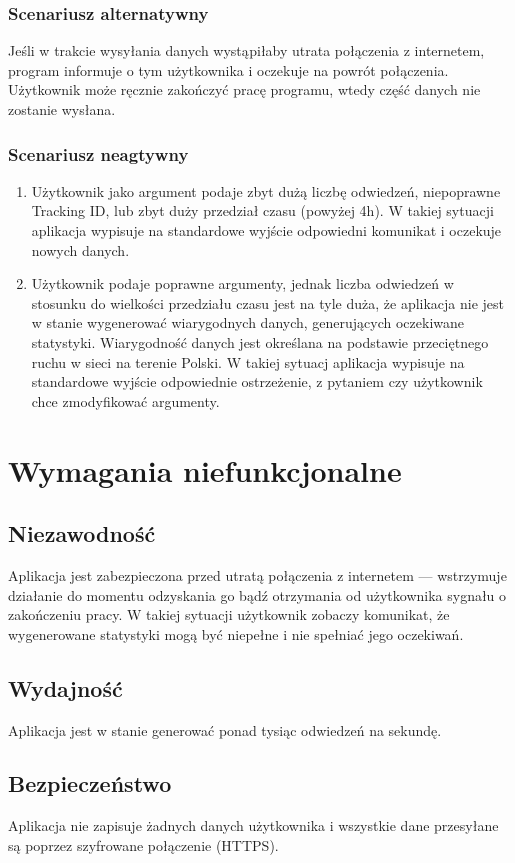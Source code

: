 \documentclass{article}
\begin{document}
\subsubsection{Scenariusz alternatywny}
Jeśli w trakcie wysyłania danych wystąpiłaby utrata połączenia z internetem, program informuje o tym użytkownika i oczekuje na powrót połączenia. Użytkownik może ręcznie zakończyć pracę programu, wtedy część danych nie zostanie wysłana.

\subsubsection{Scenariusz neagtywny}
\begin{enumerate}
	\item Użytkownik jako argument podaje zbyt dużą liczbę odwiedzeń, niepoprawne Tracking ID, lub zbyt duży przedział czasu (powyżej 4h). W takiej sytuacji aplikacja wypisuje na standardowe wyjście odpowiedni komunikat i oczekuje nowych danych.

\item Użytkownik podaje poprawne argumenty, jednak liczba odwiedzeń w stosunku do wielkości przedziału czasu jest na tyle duża, że aplikacja nie jest w stanie wygenerować wiarygodnych danych, generujących oczekiwane statystyki. Wiarygodność danych jest określana na podstawie przeciętnego ruchu w sieci na terenie Polski. W takiej sytuacj aplikacja wypisuje na standardowe wyjście odpowiednie ostrzeżenie, z pytaniem czy użytkownik chce zmodyfikować argumenty.
\end{enumerate}

\section{Wymagania niefunkcjonalne}

\subsection{Niezawodność}
Aplikacja jest zabezpieczona przed utratą połączenia z internetem --- wstrzymuje działanie do momentu odzyskania go bądź otrzymania od użytkownika sygnału o zakończeniu pracy. W takiej sytuacji użytkownik zobaczy komunikat, że wygenerowane statystyki mogą być niepełne i nie spełniać jego oczekiwań.

\subsection{Wydajność}
Aplikacja jest w stanie generować ponad tysiąc odwiedzeń na sekundę.

\subsection{Bezpieczeństwo}
Aplikacja nie zapisuje żadnych danych użytkownika i wszystkie dane przesyłane są poprzez szyfrowane połączenie (HTTPS).
\end{document}

